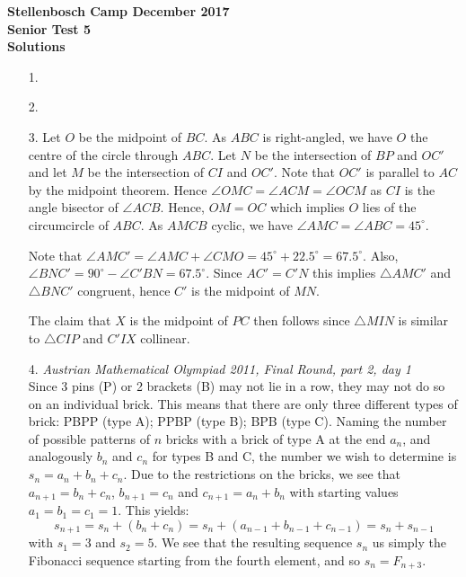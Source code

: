 \documentclass[a4paper, 12pt]{article}
\begin{document}
\begin{center}
\textbf{Stellenbosch Camp December 2017 \\ Senior Test 5} \\
\textbf{Solutions}
\end{center}


\begin{enumerate}

    \item[1.] 
    
    
    \item[2.] 
    
    
    \item[3.] Let $O$ be the midpoint of $BC$. As $ABC$ is right-angled, we have $O$ the centre of the circle through $ABC$. Let $N$ be the intersection of $BP$ and $OC'$ and let $M$ be the intersection of $CI$ and $OC'$. Note that $OC'$ is parallel to $AC$ by the midpoint theorem. Hence $\angle OMC = \angle ACM = \angle OCM$ as $CI$ is the angle bisector of $\angle ACB$. Hence, $OM = OC$ which implies $O$ lies of the circumcircle of $ABC$. As $AMCB$ cyclic, we have $\angle AMC = \angle ABC = 45^\circ$.
    
    Note that $\angle AMC' = \angle AMC + \angle CMO = 45^\circ + 22.5^\circ = 67.5^\circ$. Also, $\angle BNC' = 90^\circ - \angle C'BN = 67.5^\circ$. Since $AC' = C'N$ this implies $\triangle AMC'$ and $\triangle BNC'$ congruent, hence $C'$ is the midpoint of $MN$.
    
    The claim that $X$ is the midpoint of $PC$ then follows since $\triangle MIN$ is similar to $\triangle CIP$ and $C'IX$ collinear.
    

    \item[4.] \textit{Austrian Mathematical Olympiad 2011, Final Round, part 2, day 1} \\ Since 3 pins (P) or 2 brackets (B) may not lie in a row, they may not do so on an individual brick. This means that there are only three different types of brick: PBPP (type A); PPBP (type B); BPB (type C). Naming the number of possible patterns of $n$ bricks with a brick of type A at the end $a_n$, and analogously $b_n$ and $c_n$ for types B and C, the number we wish to determine is $s_n=a_n+b_n+c_n$. Due to the restrictions on the bricks, we see that $a_{n+1}=b_n+c_n$, $b_{n+1}=c_n$ and $c_{n+1}=a_n+b_n$ with starting values $a_1=b_1=c_1=1$. This yields:
\begin{equation*}
s_{n+1}=s_n+(b_n+c_n)=s_n+(a_{n-1}+b_{n-1}+c_{n-1})=s_n+s_{n-1}
\end{equation*}
with $s_1=3$ and $s_2=5$. We see that the resulting sequence $s_n$ us simply the Fibonacci sequence starting from the fourth element, and so $s_n=F_{n+3}$.
    

\end{enumerate}
\end{document}
